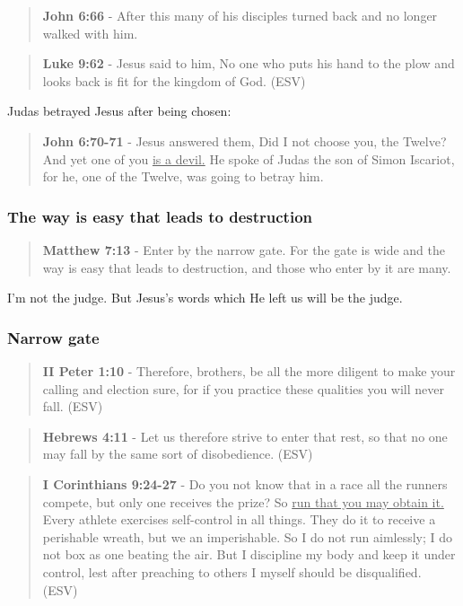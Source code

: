 \documentclass[11pt]{article}
\begin{document}
\begin{quote}
\textbf{John 6:66} - After this many of his disciples turned back and no longer walked with him.
\end{quote}

\begin{quote}
\textbf{Luke 9:62} - Jesus said to him, No one who puts his hand to the plow and looks back is fit for the kingdom of God. (ESV)
\end{quote}

Judas betrayed Jesus after being chosen:

\begin{quote}
\textbf{John 6:70-71} - Jesus answered them, Did I not choose you, the Twelve? And yet one of you \uline{is a devil.} He spoke of Judas the son of Simon Iscariot, for he, one of the Twelve, was going to betray him.
\end{quote}

\subsubsection{The way is easy that leads to destruction}
\label{sec:org207107a}
\begin{quote}
\textbf{Matthew 7:13} - Enter by the narrow gate. For the gate is wide and the way is easy that leads to destruction, and those who enter by it are many.
\end{quote}

I'm not the judge. But Jesus's words which He left us will be the judge.

\subsubsection{Narrow gate}
\label{sec:org21aa9ad}
\begin{quote}
\textbf{II Peter 1:10} - Therefore, brothers, be all the more diligent to make your calling and election sure, for if you practice these qualities you will never fall. (ESV)
\end{quote}

\begin{quote}
\textbf{Hebrews 4:11} - Let us therefore strive to enter that rest, so that no one may fall by the same sort of disobedience. (ESV)
\end{quote}

\begin{quote}
\textbf{I Corinthians 9:24-27} - Do you not know that in a race all the runners compete, but only one receives the prize? So \uline{run that you may obtain it.} Every athlete exercises self-control in all things. They do it to receive a perishable wreath, but we an imperishable. So I do not run aimlessly; I do not box as one beating the air. But I discipline my body and keep it under control, lest after preaching to others I myself should be disqualified. (ESV)
\end{quote}
\end{document}
